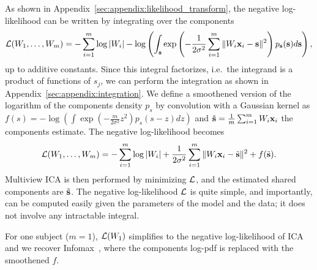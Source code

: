 \documentclass{report}
\begin{document}
{As shown in Appendix~\ref{sec:appendix:likelihood_transform}, the negative log-likelihood can be written by integrating over the components
\begin{equation} 
    \label{eq:likelihood}
    \mathcal{L}(W_1, \dots, W_m) = -\sum_{i=1}^m\log|W_i| - \log\left(\int_{\mathbf{s}}\exp\left(-\frac1{2\sigma^2}\sum_{i=1}^m\|W_i\mathbf{x}_i - \mathbf{s}\|^2\right)p_{\mathbf{s}}(\mathbf{s}) d\mathbf{s} \right),
\end{equation}
up to additive constants.
%
Since this integral factorizes, i.e.\ the integrand is a product of functions of $s_j$, we can perform the integration as shown in Appendix~\ref{sec:appendix:integration}. We define a smoothened version of the logarithm of the components density $p_s$ by convolution with a Gaussian kernel as
$
    f(s)= -\log \left(\int \exp(-\frac{m}{2\sigma^2} z^2) p_s(s-z) dz\right)
$
and $\tilde{\mathbf{s}} = \frac1m\sum_{i=1}^m W_i\mathbf{x}_i$ the components estimate.
The negative log-likelihood becomes
\begin{equation}
    \label{eq:cost_function}
    \mathcal{L}(W_1, \dots, W_m) = -\sum_{i=1}^m \log|W_i| + \frac1{2\sigma^2}\sum_{i=1}^m\|W_i\mathbf{x}_i - \tilde{\mathbf{s}}\|^2 + f(\tilde{\mathbf{s}}).
\end{equation}
Multiview ICA is then performed by minimizing $\mathcal{L}$, and the estimated shared components are $\tilde{\mathbf{s}}$.
The negative log-likelihood $\mathcal{L}$ is quite simple, and importantly, can be computed easily given the parameters of the model and the data; it does not involve any intractable integral.
%

For one subject ($m=1$), $\mathcal{L}(W_1)$ simplifies to the negative log-likelihood of ICA and we recover Infomax~\cite{bell1995information,cardoso1997infomax}, where the components log-pdf is replaced with the smoothened $f$.
%
}
\end{document}
